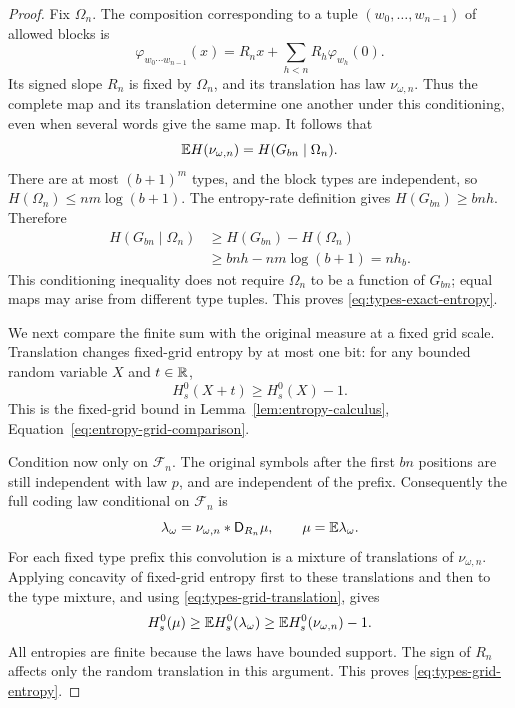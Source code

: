 \begin{proof}
Fix $\Omega_n$.  The composition corresponding to a tuple
$(w_0,\ldots,w_{n-1})$ of allowed blocks is
\[
 \varphi_{w_0\cdots w_{n-1}}(x)
   =R_nx+\sum_{h<n}R_h\varphi_{w_h}(0).
\]
Its signed slope $R_n$ is fixed by $\Omega_n$, and its translation
has law $\nu_{\omega,n}$.  Thus the complete map and its translation
determine one another under this conditioning, even when several words
give the same map.  It follows that
\[
 \mathbb E H(\nu_{\omega,n})=H(G_{bn}\mid\Omega_n).
\]
There are at most $(b+1)^m$ types, and the block types are independent,
so $H(\Omega_n)\le nm\log(b+1)$.  The entropy-rate definition gives
$H(G_{bn})\ge bnh$.  Therefore
\begin{align*}
 H(G_{bn}\mid\Omega_n)
 &\ge H(G_{bn})-H(\Omega_n)\\
 &\ge bnh-nm\log(b+1)=nh_b.
\end{align*}
This conditioning inequality does not require $\Omega_n$ to be a
function of $G_{bn}$; equal maps may arise from different type tuples.
This proves \eqref{eq:types-exact-entropy}.

We next compare the finite sum with the original measure at a fixed
grid scale.  Translation changes fixed-grid entropy by at most one bit:
for any bounded random variable $X$ and $t\in\mathbb R$,
\begin{equation}\label{eq:types-grid-translation}
 H_s^0(X+t)\ge H_s^0(X)-1.
\end{equation}
This is the fixed-grid bound in Lemma~\ref{lem:entropy-calculus},
Equation~\eqref{eq:entropy-grid-comparison}.

Condition now only on $\mathcal F_n$.
The original symbols after the first $bn$ positions are still independent
with law $p$, and are independent of the prefix.
Consequently the full coding law conditional on $\mathcal F_n$ is
\[
 \lambda_\omega
   =\nu_{\omega,n}*\mathsf D_{R_n}\mu,
 \qquad \mu=\mathbb E\lambda_\omega.
\]
For each fixed type prefix this convolution is a mixture of translations
of $\nu_{\omega,n}$.  Applying concavity of fixed-grid entropy first to
these translations and then to the type mixture, and using
\eqref{eq:types-grid-translation}, gives
\[
 H_s^0(\mu)
 \ge\mathbb E H_s^0(\lambda_\omega)
 \ge\mathbb E H_s^0(\nu_{\omega,n})-1.
\]
All entropies are finite because the laws have bounded support.
The sign of $R_n$ affects only the random translation in this argument.
This proves \eqref{eq:types-grid-entropy}.


\end{proof}
